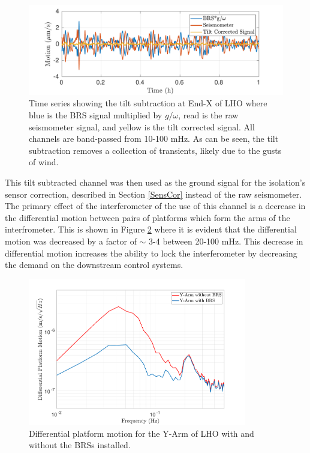 \documentclass [12pt, proquest]{uwthesis}[2019]
\begin{document}
\begin{figure}[!h]
\begin{center}
\includegraphics[width=\textwidth]{TiltCorrTime.pdf}
\caption[Time series showing tilt subtraction ]{Time series showing the tilt subtraction at End-X of LHO where blue is the BRS signal multiplied by $g/\omega$, read is the raw seismometer signal, and yellow is the tilt corrected signal. All channels are band-passed from 10-100 mHz. As can be seen, the tilt subtraction removes a collection of transients, likely due to the gusts of wind.}
\label{subTime}
\end{center}
\end{figure}

This tilt subtracted channel was then used as the ground signal for the isolation's sensor correction, described in Section \ref{SensCor} instead of the raw seismometer. The primary effect of the interferometer of the use of this channel is a decrease in the differential motion between pairs of platforms which form the arms of the interfrometer. This is shown in Figure \ref{armMotion} where it is evident that the differential motion was decreased by a factor of $\sim$ 3-4 between 20-100 mHz. This decrease in differential motion increases the ability to lock the interferometer by decreasing the demand on the downstream control systems.

\begin{figure}%
\begin{center}
\includegraphics[width=0.85\textwidth]{BRSArmMotion.pdf}
\caption[Differential platform motion ]{Differential platform motion for the Y-Arm of LHO with and without the BRSs installed. }
\label{armMotion}
\end{center}
\end{figure}
\end{document}

